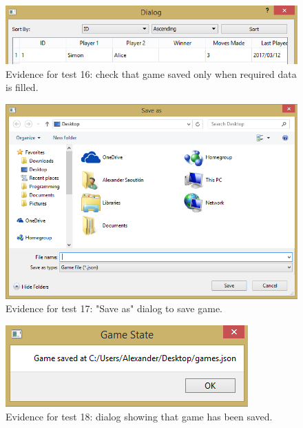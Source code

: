 \documentclass[twoside, 12pt]{report}
\begin{document}
\begin{figure}[H]
	\centering
	\includegraphics[width=1.0\textwidth]{images/screenshots/test-16}
	\caption{Evidence for test 16: check that game saved only when required data is filled.}
	\label{test-16}
\end{figure}
\begin{figure}[H]
	\centering
	\includegraphics[width=1.0\textwidth]{images/screenshots/test-17}
	\caption{Evidence for test 17: "Save as" dialog to save game.}
	\label{test-17}
\end{figure}
\begin{figure}[H]
	\centering
	\includegraphics{images/screenshots/test-18}
	\caption{Evidence for test 18: dialog showing that game has been saved.}
	\label{test-18}
\end{figure}
\end{document}

